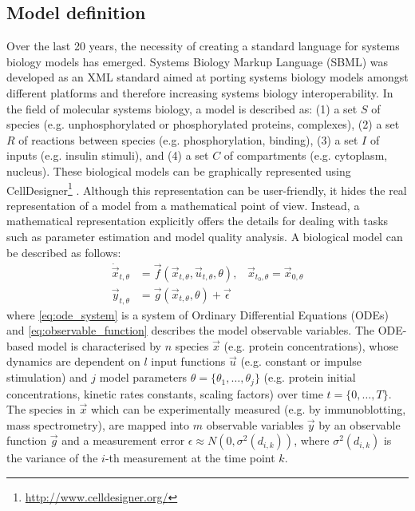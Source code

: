 \subsection{Model definition}
\label{subsec:Model definition}
Over the last 20 years, the necessity of creating a standard language for systems biology models has emerged. Systems Biology Markup Language (SBML) \citep{hucka2003systems} was developed as an XML standard aimed at porting systems biology models amongst different platforms and therefore increasing systems biology interoperability. In the field of molecular systems biology, a model is described as: (1) a set $S$ of species (e.g. unphosphorylated or phosphorylated proteins, complexes), (2) a set $R$ of reactions between species (e.g. phosphorylation, binding), (3) a set $I$ of inputs (e.g. insulin stimuli), and (4) a set $C$ of compartments (e.g. cytoplasm, nucleus). These biological models can be graphically represented using CellDesigner\footnote{\href{http://www.celldesigner.org/}{http://www.celldesigner.org/}} \citep{Funahashi2003, Funahashi2008}. Although this representation can be user-friendly, it hides the real representation of a model from a mathematical point of view. Instead, a mathematical 
representation explicitly offers the details for dealing with tasks such as parameter estimation and model quality analysis. A biological model can be described as follows:
\begin{align}
  \dot{\vec{x}}_{t,\theta} &= \vec{f}(\vec{x}_{t,\theta},\vec{u}_{t,\theta},\theta),\;\;\; \vec{x}_{t_{0},\theta} = \vec{x}_{0,\theta} \label{eq:ode_system} \\
  \vec{y}_{t,\theta} &= \vec{g}(\vec{x}_{t,\theta},\theta) + \vec{\epsilon} \label{eq:observable_function}
\end{align}
where \ref{eq:ode_system} is a system of Ordinary Differential Equations (ODEs) and \ref{eq:observable_function} describes the model observable variables. The ODE-based model is characterised by $n$ species $\vec{x}$ (e.g. protein concentrations), whose dynamics are dependent on $l$ input functions $\vec{u}$ (e.g. constant or impulse stimulation) and $j$ model parameters $\theta = \{\theta_1,\dots,\theta_j\}$ (e.g. protein initial concentrations, kinetic rates constants, scaling factors) over time $t = \{0,\dots,T\}$. The species in $\vec{x}$ which can be experimentally measured (e.g. by immunoblotting, mass spectrometry), are mapped into $m$ observable variables $\vec{y}$ by an observable function $\vec{g}$ and a measurement error $\epsilon \approx N(0,\sigma^{2}(d_{i,k}))$, where $\sigma^{2}(d_{i,k})$ is the variance of the $i$-th measurement at the time point $k$.

